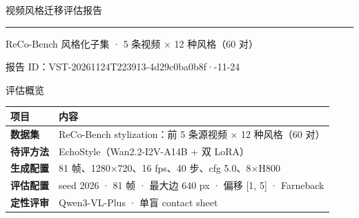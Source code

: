 \documentclass[aspectratio=169,11pt]{beamer}
\newcommand{\headrow}[1]{\color{white}\bfseries #1}
\begin{document}
\begin{frame}[plain]
\vspace{2.2cm}
{\color{white} 视频风格迁移评估报告\par}
\vspace{0.45cm}
{\color{gold}\rule{6cm}{2pt}}
\vspace{0.55cm}

{\large\color{white} ReCo-Bench 风格化子集 · 5 条视频 × 12 种风格（60 对）\par}
\vspace{0.25cm}
{\small\color{white!70!navy} 报告 ID：VST-20261124T223913-4d29c0ba0b8f\quad·-11-24}\par
\end{frame}


\begin{frame}{评估概览}
\small
\begin{tabularx}{\textwidth}{>{\bfseries}p{2.2cm}X}
\toprule
\rowcolor{navy}\headrow{项目} & \headrow{内容} \\
\midrule
数据集 & ReCo-Bench stylization：前 5 条源视频 × 12 种风格（60 对） \\
待评方法 & EchoStyle（Wan2.2-I2V-A14B + 双 LoRA） \\
生成配置 & 81 帧、1280×720、16 fps、40 步、cfg 5.0、8×H800 \\
评估配置 & seed 2026 · 81 帧 · 最大边 640 px · 偏移 [1, 5] · Farneback \\
定性评审 & Qwen3-VL-Plus · 单盲 contact sheet \\
\bottomrule
\end{tabularx}
\end{frame}
\end{document}

